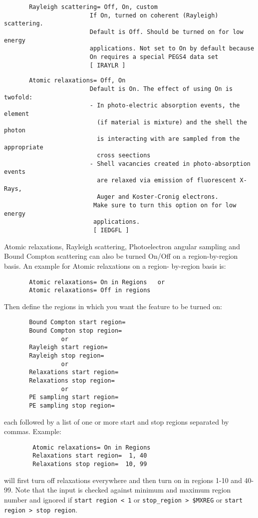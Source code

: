 \begin{verbatim}
       Rayleigh scattering= Off, On, custom
                        If On, turned on coherent (Rayleigh) scattering.
                        Default is Off. Should be turned on for low energy
                        applications. Not set to On by default because 
                        On requires a special PEGS4 data set
                        [ IRAYLR ]
\end{verbatim}
\begin{verbatim}
       Atomic relaxations= Off, On
                        Default is On. The effect of using On is twofold:
                        - In photo-electric absorption events, the element
                          (if material is mixture) and the shell the photon
                          is interacting with are sampled from the appropriate
                          cross seections
                        - Shell vacancies created in photo-absorption events
                          are relaxed via emission of fluorescent X-Rays,
                          Auger and Koster-Cronig electrons.
                         Make sure to turn this option on for low energy
                         applications.
                         [ IEDGFL ]
\end{verbatim}

\noindent
Atomic relaxations, Rayleigh scattering, Photoelectron angular sampling 
and Bound Compton scattering can also be turned On/Off on a 
region-by-region basis. An example for Atomic relaxations on a region-
by-region basis is:

\begin{verbatim}
       Atomic relaxations= On in Regions   or
       Atomic relaxations= Off in regions
\end{verbatim}

Then define the regions in which you want the feature to be turned on:

\begin{verbatim}
       Bound Compton start region=
       Bound Compton stop region=
                or
       Rayleigh start region=
       Rayleigh stop region=
                or
       Relaxations start region=
       Relaxations stop region=
                or
       PE sampling start region=
       PE sampling stop region=
\end{verbatim}
each followed by a list of one or more start and stop regions 
separated by commas. Example:
\begin{verbatim}
        Atomic relaxations= On in Regions
        Relaxations start region=  1, 40
        Relaxations stop region=  10, 99
\end{verbatim}
will first turn off relaxations everywhere and
then turn on in regions 1-10 and 40-99.
Note that the input is checked against minimum and maximum
region number and ignored if
\verb+start region < 1+ or \verb+stop_region > $MXREG+ or
\verb+start region > stop region+.

